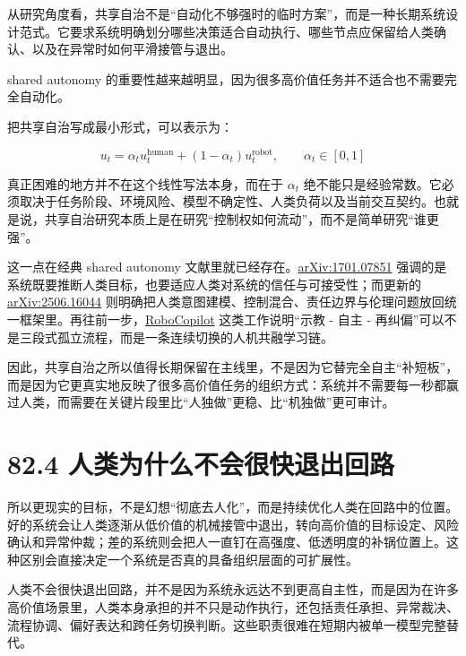 从研究角度看，共享自治不是“自动化不够强时的临时方案”，而是一种长期系统设计范式。它要求系统明确划分哪些决策适合自动执行、哪些节点应保留给人类确认、以及在异常时如何平滑接管与退出。

shared autonomy 的重要性越来越明显，因为很多高价值任务并不适合也不需要完全自动化。

把共享自治写成最小形式，可以表示为：

\begingroup
\scriptsize
\begin{equation*}
u_t = \alpha_t u_t^{\text{human}} + (1-\alpha_t)u_t^{\text{robot}}, \qquad
\alpha_t \in [0,1]
\end{equation*}
\endgroup

真正困难的地方并不在这个线性写法本身，而在于 \(\alpha_t\) 绝不能只是经验常数。它必须取决于任务阶段、环境风险、模型不确定性、人类负荷以及当前交互契约。也就是说，共享自治研究本质上是在研究“控制权如何流动”，而不是简单研究“谁更强”。

这一点在经典 shared autonomy 文献里就已经存在。\href{https://arxiv.org/abs/1701.07851}{arXiv:1701.07851} 强调的是系统既要推断人类目标，也要适应人类对系统的信任与可接受性；而更新的 \href{https://arxiv.org/abs/2506.16044}{arXiv:2506.16044} 则明确把人类意图建模、控制混合、责任边界与伦理问题放回统一框架里。再往前一步，\href{https://arxiv.org/abs/2503.07771}{RoboCopilot} 这类工作说明“示教 - 自主 - 再纠偏”可以不是三段式孤立流程，而是一条连续切换的人机共融学习链。

因此，共享自治之所以值得长期保留在主线里，不是因为它替完全自主“补短板”，而是因为它更真实地反映了很多高价值任务的组织方式：系统并不需要每一秒都赢过人类，而需要在关键片段里比“人独做”更稳、比“机独做”更可审计。

\section*{82.4 人类为什么不会很快退出回路}


所以更现实的目标，不是幻想“彻底去人化”，而是持续优化人类在回路中的位置。好的系统会让人类逐渐从低价值的机械接管中退出，转向高价值的目标设定、风险确认和异常仲裁；差的系统则会把人一直钉在高强度、低透明度的补锅位置上。这种区别会直接决定一个系统是否真的具备组织层面的可扩展性。

人类不会很快退出回路，并不是因为系统永远达不到更高自主性，而是因为在许多高价值场景里，人类本身承担的并不只是动作执行，还包括责任承担、异常裁决、流程协调、偏好表达和跨任务切换判断。这些职责很难在短期内被单一模型完整替代。

